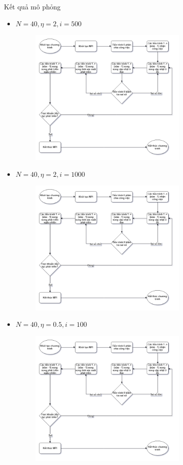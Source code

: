 \begin{frame}[allowframebreaks]{Kết quả mô phỏng}
\begin{itemize}
\begin{figure}[H]
    \end{figure}
\end{itemize}
\break
\begin{itemize}
    \item $N = 40, \eta = 2, i = 500$
    \begin{figure}[H]
        \centering
        \includegraphics[width=77mm]{img/algo-flowchart.png}
    \end{figure}
\end{itemize}
\break
\begin{itemize}
    \item $N = 40, \eta = 2, i = 1000$
    \begin{figure}[H]
        \centering
        \includegraphics[width=77mm]{img/algo-flowchart.png}
    \end{figure}
\end{itemize}
\break
\begin{itemize}
    \item $N = 40, \eta = 0.5, i = 100$
    \begin{figure}[H]
        \centering
        \includegraphics[width=77mm]{img/algo-flowchart.png}

\end{figure}
\end{itemize}
\end{frame}

